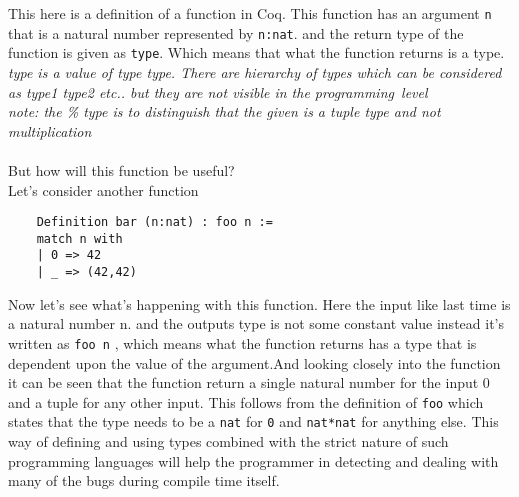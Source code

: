 This here is a definition of a function in Coq. This function has an argument \verb|n| that is a natural
number represented by \verb|n:nat|. and the return type of the function is given as \verb|type|. Which
means that what the function returns is a type. \textit{type is a value of type type. There are hierarchy
of types which can be considered as type1 type2 etc.. but they are not visible in the programming\ level}\\
\textit{note: the \% type is to distinguish that the given is a tuple type and not multiplication}\\ \\
But how will this function be useful? \\ Let's consider another function
\begin{verbatim}
    Definition bar (n:nat) : foo n :=
    match n with
    | 0 => 42
    | _ => (42,42)
\end{verbatim}
Now let's see what's happening with this function. Here the input like last time is a natural number n.
and the outputs type is not some constant value instead it's written as \verb|foo n| , which means 
what the function returns has a type that is dependent upon the value of the argument.And looking closely
into the function it can be seen that the function return a single natural number for the input 0 and
a tuple for any other input. This follows from the definition of \verb|foo| which states that the type
needs to be a \verb|nat| for \verb|0| and \verb|nat*nat| for anything else. This way of defining and using
types combined with the strict nature of such programming languages will help the programmer in detecting
and dealing with many of the bugs during compile time itself.

